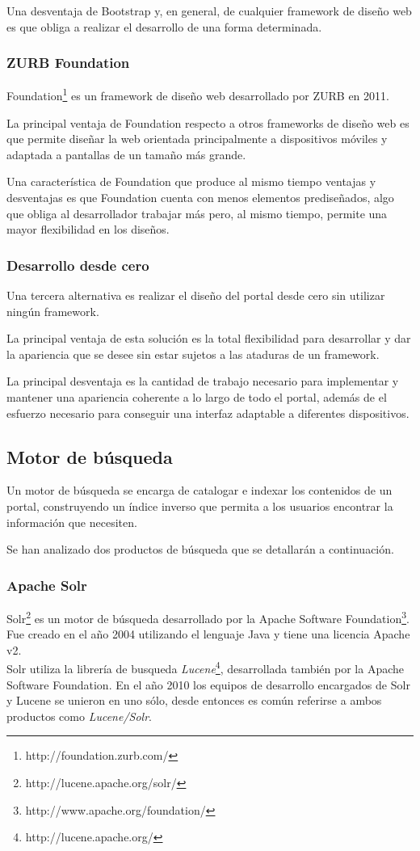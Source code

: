 Una desventaja de Bootstrap y, en general, de cualquier framework de diseño web es que obliga a realizar el desarrollo de una forma determinada.


\subsubsection{ZURB Foundation}
Foundation\footnote{http://foundation.zurb.com/} es un framework de diseño web desarrollado por ZURB en 2011.

La principal ventaja de Foundation respecto a otros frameworks de diseño web es que permite diseñar la web orientada principalmente a dispositivos móviles y adaptada a pantallas de un tamaño más grande.

Una característica de Foundation que produce al mismo tiempo ventajas y desventajas es que Foundation cuenta con menos elementos prediseñados, algo que obliga al desarrollador trabajar más pero, al mismo tiempo, permite una mayor flexibilidad en los diseños.


\subsubsection{Desarrollo desde cero}
Una tercera alternativa es realizar el diseño del portal desde cero sin utilizar ningún framework.

La principal ventaja de esta solución es la total flexibilidad para desarrollar y dar la apariencia que se desee sin estar sujetos a las ataduras de un framework.

La principal desventaja es la cantidad de trabajo necesario para implementar y mantener una apariencia coherente a lo largo de todo el portal, además de el esfuerzo necesario para conseguir una interfaz adaptable a diferentes dispositivos.



\subsection{Motor de búsqueda}
Un motor de búsqueda se encarga de catalogar e indexar los contenidos de un portal, construyendo un índice inverso que permita a los usuarios encontrar la información que necesiten.

Se han analizado dos productos de búsqueda que se detallarán a continuación.


\subsubsection{Apache Solr}
Solr\footnote{http://lucene.apache.org/solr/} es un motor de búsqueda desarrollado por la Apache Software Foundation\footnote{http://www.apache.org/foundation/}.  Fue creado en el año 2004 utilizando el lenguaje Java y tiene una licencia Apache v2. \\
Solr utiliza la librería de busqueda \textit{Lucene}\footnote{http://lucene.apache.org/}, desarrollada también por la Apache Software Foundation.  En el año 2010 los equipos de desarrollo encargados de Solr y Lucene se unieron en uno sólo, desde entonces es común referirse a ambos productos como  \textit{Lucene/Solr}.

